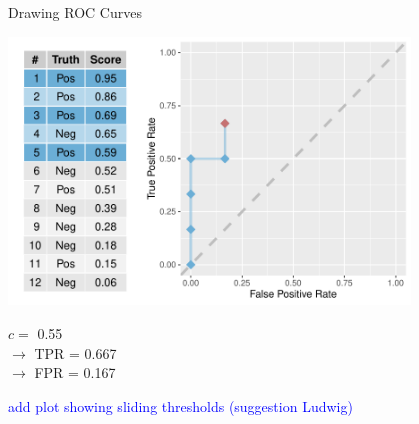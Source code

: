 \begin{vbframe}{Drawing ROC Curves}

\begin{knitrout}\scriptsize
{}\color{fgcolor}

{
\includegraphics[width=0.8\textwidth]{figure/eval_mclass_roc_sp_9}
}

\end{knitrout}

\vfill

\begin{minipage}[b]{0.3\textwidth}
  $c =$ 0.55\\ 
  $\rightarrow$ TPR = 0.667 \\
  $\rightarrow$ FPR = 0.167
\end{minipage}%
\begin{minipage}[b]{0.7\textwidth}
  \textcolor{blue}{add plot showing sliding thresholds (suggestion Ludwig)}
\end{minipage}

\end{vbframe}


